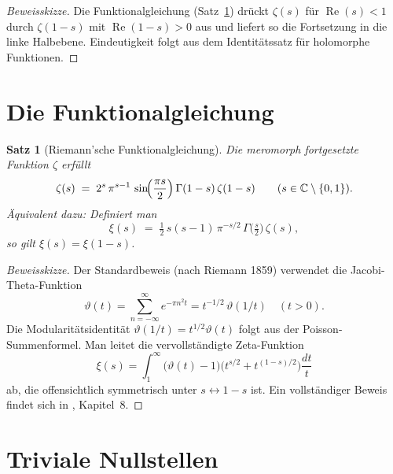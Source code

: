 \documentclass[12pt,a4paper]{amsart}
\newtheorem{theorem}{Satz}[section]
\theoremstyle{definition}
\newcommand{\C}{\mathbb{C}}
\DeclareMathOperator{\Re}{Re}
\begin{document}
\begin{proof}[Beweisskizze]
Die Funktionalgleichung (Satz~\ref{thm:functional_eq}) dr\"uckt $\zeta(s)$
f\"ur $\Re(s) < 1$ durch $\zeta(1-s)$ mit $\Re(1-s) > 0$ aus und
liefert so die Fortsetzung in die linke Halbebene.
Eindeutigkeit folgt aus dem Identit\"atssatz f\"ur holomorphe Funktionen.
\end{proof}

\section{Die Funktionalgleichung}

\begin{theorem}[Riemann'sche Funktionalgleichung]
\label{thm:functional_eq}
Die meromorph fortgesetzte Funktion $\zeta$ erf\"ullt
\begin{equation}
  \label{eq:functional}
  \zeta(s) \;=\; 2^s\,\pi^{s-1}\,\sin\!\Bigl(\frac{\pi s}{2}\Bigr)\,
  \Gamma(1-s)\,\zeta(1-s)
  \qquad (s \in \C \setminus \{0,1\}).
\end{equation}
\"Aquivalent dazu: Definiert man
\[
  \xi(s) \;=\; \tfrac{1}{2}\,s(s-1)\,\pi^{-s/2}\,\Gamma\!\bigl(\tfrac{s}{2}\bigr)\,\zeta(s),
\]
so gilt $\xi(s) = \xi(1-s)$.
\end{theorem}

\begin{proof}[Beweisskizze]
Der Standardbeweis (nach Riemann 1859) verwendet die Jacobi-Theta-Funktion
\[
  \vartheta(t) = \sum_{n=-\infty}^{\infty} e^{-\pi n^2 t}
  = t^{-1/2}\,\vartheta(1/t) \quad (t > 0).
\]
Die Modularit\"atsidentit\"at $\vartheta(1/t) = t^{1/2}\vartheta(t)$ folgt
aus der Poisson-Summenformel.
Man leitet die vervollst\"andigte Zeta-Funktion
\[
  \xi(s) = \int_1^{\infty} \bigl(\vartheta(t)-1\bigr)
  \bigl(t^{s/2} + t^{(1-s)/2}\bigr)\frac{dt}{t}
\]
ab, die offensichtlich symmetrisch unter $s \leftrightarrow 1-s$ ist.
Ein vollst\"andiger Beweis findet sich in \cite{Davenport2000}, Kapitel~8.
\end{proof}

\section{Triviale Nullstellen}
\end{document}
